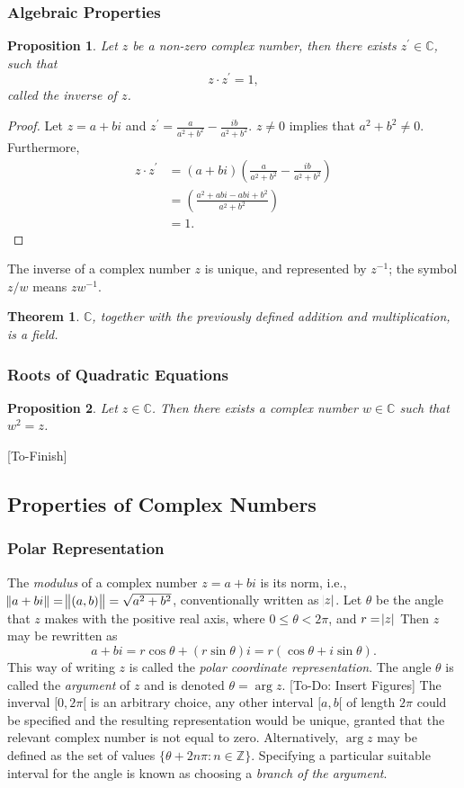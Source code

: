 \documentclass[12pt]{article}
\newcommand{\CC}{\mathbb{C}}
\newcommand{\ZZ}{\mathbb{Z}}
\newtheorem{theorem}{Theorem}[section]
\newtheorem{prop}{Proposition}[theorem]
\theoremstyle{definition}
\begin{document}
\subsubsection{Algebraic Properties}
\begin{prop}
	Let $z$ be a non-zero complex number, then there exists $z^\prime \in \CC$, such that
	\[ z\cdot z^\prime = 1 , \]
	called the inverse of $z$.
\end{prop}
\begin{proof}
	Let $z = a+bi$ and $z^\prime = \frac{a}{a^2 + b^2} - \frac{ib}{a^2+b^2}$. $z \neq 0$ implies that $a^2 + b^2 \neq 0$. Furthermore,
	\begin{align*}
		z \cdot z^\prime &= (a+bi) \left (\frac{a}{a^2 + b^2} - \frac{ib}{a^2+b^2} \right) \\
		&= \left ( \frac{a^2 + abi - abi + b^2}{a^2+b^2} \right ) \\
		&= 1.
	\end{align*}
\end{proof}
The inverse of a complex number $z$ is unique, and represented by $z^{-1}$; the symbol $z/w$ means $zw^{-1}$.
\begin{theorem}
	$\CC$, together with the previously defined addition and multiplication, is a field.	
\end{theorem}
\subsubsection{Roots of Quadratic Equations}
\begin{prop}
Let $z \in \CC$. Then there exists a complex number $w \in \CC$ such that $w^2 = z$.	
\end{prop}
[To-Finish]
\subsection{Properties of Complex Numbers}
\subsubsection{Polar Representation}
The \emph{modulus} of a complex number $z=a+bi$ is its norm, i.e., $\norm{a+bi} = \norm{(a,b)} = \sqrt{a^2 + b^2}$, conventionally written as $\abs{z}$. Let $\theta$ be the angle that $z$ makes with the positive real axis, where $0 \leq \theta < 2\pi$, and $r = \abs{z}$ Then $z$ may be rewritten as
\[ 
	a+bi = r \cos \theta + (r \sin \theta) i = r(\cos \theta + i \sin \theta).
\]
This way of writing $z$ is called the \emph{polar coordinate representation}. The angle $\theta$ is called the \emph{argument} of $z$ and is denoted $\theta = \arg z$.
[To-Do: Insert Figures]
The inverval $[0, 2 \pi[$ is an arbitrary choice, any other interval $[a,b[$ of length $2\pi$ could be specified and the resulting representation would be unique, granted that the relevant complex number is not equal to zero. Alternatively, $\arg z$ may be defined as the set of values $\{ \theta + 2n \pi : n \in \ZZ \}$. Specifying a particular suitable interval for the angle is known as choosing a \emph{branch of the argument}.
\end{document}
